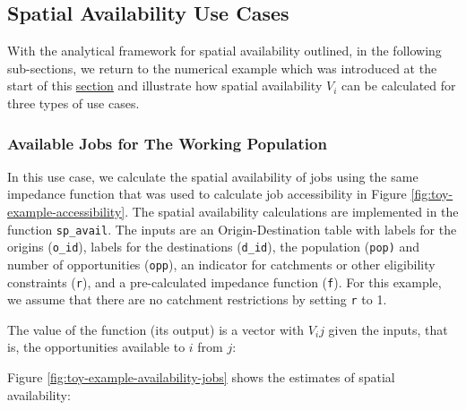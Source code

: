 \documentclass[]{elsarticle} %
\begin{document}
\hypertarget{spatial-availability-use-cases}{%
\subsection{Spatial Availability Use
Cases}\label{spatial-availability-use-cases}}

With the analytical framework for spatial availability outlined, in the
following sub-sections, we return to the numerical example which was
introduced at the start of this
\protect\hyperlink{accessibility-numerical-example}{section} and
illustrate how spatial availability \(V_i\) can be calculated for three
types of use cases.

\hypertarget{available-jobs-for-the-working-population}{%
\subsubsection{Available Jobs for The Working
Population}\label{available-jobs-for-the-working-population}}

In this use case, we calculate the spatial availability of jobs using
the same impedance function that was used to calculate job accessibility
in Figure \ref{fig:toy-example-accessibility}. The spatial availability
calculations are implemented in the function \texttt{sp\_avail}. The
inputs are an Origin-Destination table with labels for the origins
(\texttt{o\_id}), labels for the destinations (\texttt{d\_id}), the
population (\texttt{pop)} and number of opportunities (\texttt{opp}), an
indicator for catchments or other eligibility constraints (\texttt{r}),
and a pre-calculated impedance function (\texttt{f}). For this example,
we assume that there are no catchment restrictions by setting \texttt{r}
to 1.

The value of the function (its output) is a vector with \(V_ij\) given
the inputs, that is, the opportunities available to \(i\) from \(j\):

Figure \ref{fig:toy-example-availability-jobs} shows the estimates of
spatial availability:
\end{document}
